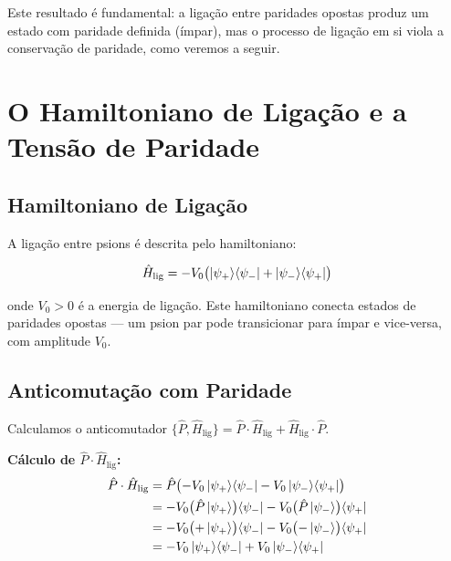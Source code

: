 \documentclass[12pt,a4paper,twoside]{article}
\newcommand{\psion}{\psi}
\begin{document}
\noindent Este resultado \'e fundamental: a liga\c{c}\~ao entre paridades opostas produz um estado com paridade definida (\'impar), mas o processo de liga\c{c}\~ao em si viola a conserva\c{c}\~ao de paridade, como veremos a seguir.


\section{O Hamiltoniano de Liga\c{c}\~ao e a Tens\~ao de Paridade}


\subsection{Hamiltoniano de Liga\c{c}\~ao}

A liga\c{c}\~ao entre psions \'e descrita pelo hamiltoniano:
\begin{equationbox}[title={Hamiltoniano de Liga\c{c}\~ao Psi\^onica}]
\begin{equation}
\hat{H}_{\text{lig}} = -V_0\bigl(\ket{\psion_+}\!\bra{\psion_-} + \ket{\psion_-}\!\bra{\psion_+}\bigr)
\label{eq:hamiltoniano_lig}
\end{equation}
\end{equationbox}

\noindent onde $V_0 > 0$ \'e a energia de liga\c{c}\~ao. Este hamiltoniano conecta estados de paridades opostas --- um psion par pode transicionar para \'impar e vice-versa, com amplitude $V_0$.

\subsection{Anticomuta\c{c}\~ao com Paridade}

Calculamos o anticomutador $\{\hat{P}, \hat{H}_{\text{lig}}\} = \hat{P}\cdot\hat{H}_{\text{lig}} + \hat{H}_{\text{lig}}\cdot\hat{P}$.

\medskip
\noindent\textbf{C\'alculo de $\hat{P}\cdot\hat{H}_{\text{lig}}$:}
\begin{align}
\hat{P}\cdot\hat{H}_{\text{lig}} &= \hat{P}\bigl(-V_0\ket{\psion_+}\!\bra{\psion_-} - V_0\ket{\psion_-}\!\bra{\psion_+}\bigr) \notag \\
&= -V_0\bigl(\hat{P}\ket{\psion_+}\bigr)\!\bra{\psion_-} - V_0\bigl(\hat{P}\ket{\psion_-}\bigr)\!\bra{\psion_+} \notag \\
&= -V_0\bigl(+\ket{\psion_+}\bigr)\!\bra{\psion_-} - V_0\bigl(-\ket{\psion_-}\bigr)\!\bra{\psion_+} \notag \\
&= -V_0\ket{\psion_+}\!\bra{\psion_-} + V_0\ket{\psion_-}\!\bra{\psion_+}
\label{eq:PH}
\end{align}
\end{document}
